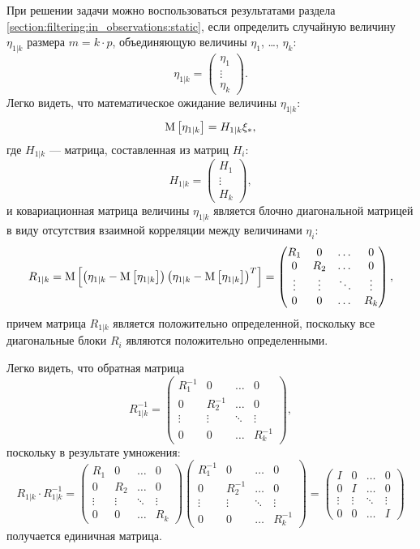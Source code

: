 При решении задачи можно воспользоваться результатами раздела \ref{section:filtering:in_observations:static}, если определить случайную величину $\eta_{1|k}$ размера
$m = k \cdot p$, объединяющую величины $\eta_1$, \dots, $\eta_k$:
$$
	\eta_{1|k}
	=
	\begin{pmatrix}
		\eta_1 \\
		\vdots \\
		\eta_k
	\end{pmatrix}
	.
$$
Легко видеть, что математическое ожидание величины $\eta_{1|k}$:
$$
	\mathrm{M} \left [ \eta_{1|k} \right ] = H_{1|k} \xi_* ,
$$
где $H_{1|k}$ --- матрица, составленная из матриц $H_i$:
$$
	H_{1|k}
	=
	\begin{pmatrix}
		H_1 \\
		\vdots \\
		H_k
	\end{pmatrix}
	,
$$
и ковариационная матрица величины $\eta_{1|k}$ является блочно диагональной матрицей в виду отсутствия взаимной корреляции между величинами $\eta_i$:
$$
	R_{1|k}
	= \mathrm{M} \left [ \left ( \eta_{1|k} - \mathrm{M} \left [ \eta_{1|k} \right ] \right ) \left ( \eta_{1|k} - \mathrm{M} \left [ \eta_{1|k} \right ] \right )^T \right ]
	=
	\begin{pmatrix}
		R_1    & 0      & \dots  & 0 \\
		0      & R_2    & \dots  & 0 \\
		\vdots & \vdots & \ddots & \vdots \\
		0      & 0      & \dots  & R_k
	\end{pmatrix}
	,
$$
причем матрица $R_{1|k}$ является положительно определенной, поскольку все диагональные блоки $R_i$ являются положительно определенными.

Легко видеть, что обратная матрица
$$
	R_{1|k}^{-1}
	=
	\begin{pmatrix}
		R_1^{-1} & 0        & \dots  & 0 \\
		0        & R_2^{-1} & \dots  & 0 \\
		\vdots   & \vdots   & \ddots & \vdots \\
		0        & 0        & \dots  & R_k^{-1}
	\end{pmatrix}
	,
$$
поскольку в результате умножения:
$$
	R_{1|k} \cdot R_{1|k}^{-1}
	=
	\begin{pmatrix}
		R_1    & 0      & \dots  & 0 \\
		0      & R_2    & \dots  & 0 \\
		\vdots & \vdots & \ddots & \vdots \\
		0      & 0      & \dots  & R_k
	\end{pmatrix}
	\begin{pmatrix}
		R_1^{-1} & 0        & \dots  & 0 \\
		0        & R_2^{-1} & \dots  & 0 \\
		\vdots   & \vdots   & \ddots & \vdots \\
		0        & 0        & \dots  & R_k^{-1}
	\end{pmatrix}
	=
	\begin{pmatrix}
		I      & 0      & \dots  & 0 \\
		0      & I      & \dots  & 0 \\
		\vdots & \vdots & \ddots & \vdots \\
		0      & 0      & \dots  & I
	\end{pmatrix}
$$
получается единичная матрица.


